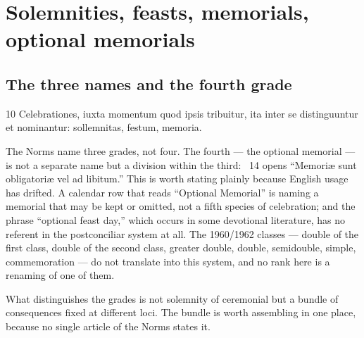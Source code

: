 \section{Solemnities, feasts, memorials, optional memorials}
\label{sec:ranks}

\subsection{The three names and the fourth grade}

\begin{normtext}{ 10}
Celebrationes, iuxta momentum quod ipsis tribuitur, ita inter se distinguuntur et nominantur:
sollemnitas, festum, memoria.
\end{normtext}

The Norms name three grades, not four. The fourth --- the optional memorial --- is not a separate
name but a division within the third: ~14 opens ``Memoriæ sunt obligatoriæ vel ad
libitum.'' This is worth stating plainly because English usage has drifted. A calendar row that
reads ``Optional Memorial'' is naming a memorial that may be kept or omitted, not a fifth species of
celebration; and the phrase ``optional feast day,'' which occurs in some devotional literature, has
no referent in the postconciliar system at all. The 1960/1962 classes --- double of the first class,
double of the second class, greater double, double, semidouble, simple, commemoration --- do not
translate into this system, and no rank here is a renaming of one of them.

What distinguishes the grades is not solemnity of ceremonial but a bundle of consequences fixed at
different loci. The bundle is worth assembling in one place, because no single article of the Norms
states it.

